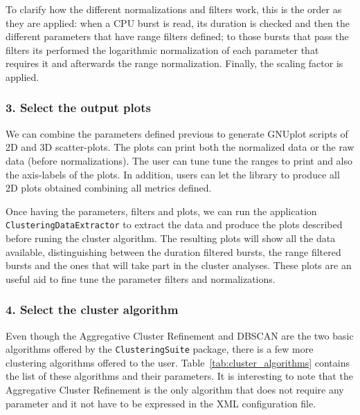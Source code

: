 \documentclass[a4paper, 12pt]{article}
\begin{document}
To clarify how the different normalizations and filters work, this is the 
order as they are applied: when a CPU burst is read, its duration is checked
and then the different parameters that have range filters defined; to those
bursts that pass the filters its performed the logarithmic normalization of 
each parameter that requires it and afterwards the range normalization. 
Finally, the scaling factor is applied.

\subsubsection*{3. Select the output plots}

We can combine the parameters defined previous to generate GNUplot scripts
of 2D and 3D scatter-plots. The plots can print both the normalized data or
the raw data (before normalizations). The user can tune tune the ranges to 
print and also the axis-labels of the plots. In addition, users can let the
library to produce all 2D plots obtained combining all metrics defined.

Once having the parameters, filters and plots, we can run the application
\texttt{Clustering\-DataExtractor} to extract the data and produce the plots 
described before runing the cluster algorithm. The resulting plots will 
show all the data available, distinguishing between the duration filtered 
bursts, the range filtered bursts and the ones that will take part in the 
cluster analyses. These plots are an useful aid to fine tune the parameter 
filters and normalizations.

\subsubsection*{4. Select the cluster algorithm}

Even though the Aggregative Cluster Refinement and DBSCAN are the two basic
algorithms offered by the \texttt{ClusteringSuite} package, there is a few
more clustering algorithms offered to the user. Table~\ref{tab:cluster_algorithms}
contains the list of these algorithms and their parameters. It is interesting
to note that the Aggregative Cluster Refinement is the only algorithm that
does not require any parameter and it not have to be expressed in the
XML configuration file.
\end{document}

